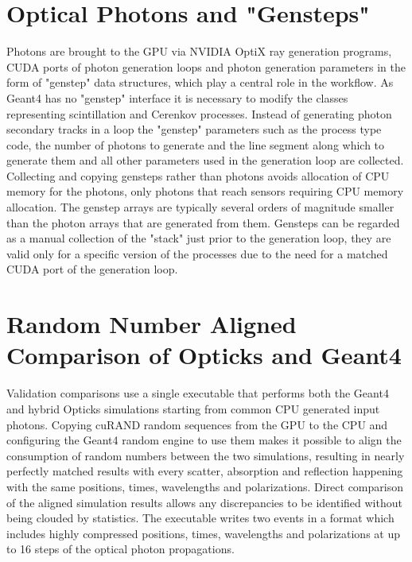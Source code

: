 \documentclass{webofc}
\begin{document}
\section{Optical Photons and "Gensteps"}%
%
Photons are brought to the GPU via NVIDIA OptiX ray generation programs, 
CUDA ports of photon generation loops and photon generation parameters 
in the form of "genstep" data structures, which play a central role in the workflow.
%
As Geant4 has no "genstep" interface it is necessary to modify the classes
representing scintillation and Cerenkov processes. Instead of generating photon
secondary tracks in a loop the "genstep" parameters such as   
the process type code, the number of photons to generate and the line segment along which to generate
them and all other parameters used in the generation loop are collected. 
Collecting and copying gensteps rather than photons avoids
allocation of CPU memory for the photons, only photons that reach sensors
requiring CPU memory allocation. 
The genstep arrays are typically several orders of magnitude smaller than the photon arrays 
that are generated from them.   
%
Gensteps can be regarded as a manual collection of the "stack" just 
prior to the generation loop, they are valid only for a specific version of the processes 
due to the need for a matched CUDA port of the generation loop.  
%
%

\section{Random Number Aligned Comparison of Opticks and Geant4}
\label{validation}
%
Validation comparisons use a single executable that performs both
the Geant4 and hybrid Opticks simulations starting from common CPU generated input photons. 
Copying cuRAND random sequences from the GPU to the CPU and configuring the Geant4 random engine to use them makes it possible to align the 
consumption of random numbers between the two simulations, resulting in nearly perfectly matched results with every scatter, 
absorption and reflection happening with the same positions, times, wavelengths and polarizations.
Direct comparison of the aligned simulation results allows any discrepancies to be identified without
being clouded by statistics.
The executable writes two events in a format which includes highly compressed positions, times, wavelengths 
and polarizations at up to 16 steps of the optical photon propagations.
\end{document}
